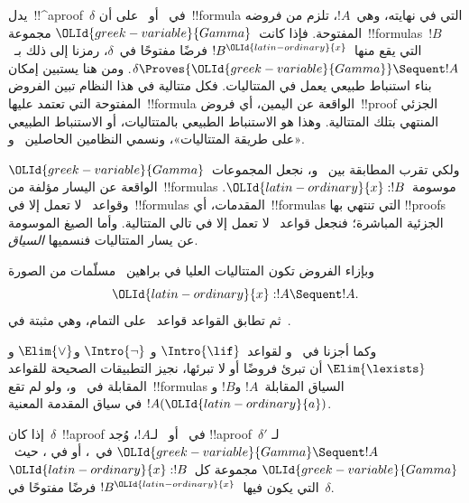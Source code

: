 \documentclass[../../../include/open-logic-section]{subfiles}
\begin{document}


يدل~!!^a{proof}~$\delta$ في~ أو~ على أن~!!{formula}
التي في نهايته، وهي~$!A$، تلزم من فروضه المفتوحة. فإذا كانت~${\OLId{greek-variable}{Gamma}}$
مجموعة~!!{formula}s~$!B$ التي يقع منها~$!B^{\OLId{latin-ordinary}{x}}$ فرضًا مفتوحًا في~$\delta$،
رمزنا إلى ذلك بـ~$\delta \Proves {\OLId{greek-variable}{Gamma}} \Sequent !A$. ومن هنا يستبين
إمكان بناء استنباط طبيعي يعمل في المتتاليات. فكل متتالية في هذا النظام
تبين الفروض المفتوحة التي تعتمد عليها~!!{formula} الواقعة عن اليمين،
أي فروض~!!{proof} الجزئي المنتهي بتلك المتتالية. وهذا هو الاستنباط
الطبيعي بالمتتاليات، أو الاستنباط الطبيعي «على طريقة المتتاليات»،
ونسمي النظامين الحاصلين~ و.

ولكي تقرب المطابقة بين~ و، نجعل المجموعات~${\OLId{greek-variable}{Gamma}}$
الواقعة عن اليسار مؤلفة من~!!{formula}s موسومة~${\OLId{latin-ordinary}{x}}:!B$. وقواعد~
لا تعمل إلا في~!!{formula}s المقدمات، أي~!!{formula}s التي تنتهي بها
!!{proof}s الجزئية المباشرة؛ فنجعل قواعد~ لا تعمل إلا في تالي
المتتالية. وأما الصيغ الموسومة عن يسار المتتاليات فنسميها
\emph{السياق}.

وبإزاء الفروض تكون المتتاليات العليا في براهين~ مسلّمات من الصورة
\[{\OLId{latin-ordinary}{x}}:!A \Sequent !A.\]
ثم تطابق القواعد قواعد~ على التمام، وهي مثبتة في~.



وكما أجزنا في~ و لقواعد~$\Intro{\lif}$ و
$\Intro{\lnot}$ و$\Elim{\lor}$ و$\Elim{\lexists}$ أن تبرئ فروضًا أو
لا تبرئها، نجيز التطبيقات الصحيحة للقواعد المقابلة في~
و، ولو لم تقع~!!{formula}s السياق المقابلة~$!A$ و$!B$
و$!A({\OLId{latin-ordinary}{a}})$ في سياق المقدمة المعنية.

\begin{prop}
إذا كان~$\delta$~!!a{proof} في~ أو~ لـ$!A$، وُجد
!!a{proof}~$\delta'$ لـ${\OLId{greek-variable}{Gamma}} \Sequent !A$ في~، أو في
، حيث~${\OLId{greek-variable}{Gamma}}$ مجموعة كل~${\OLId{latin-ordinary}{x}}:!B$ التي يكون فيها~$!B^{\OLId{latin-ordinary}{x}}$ فرضًا
مفتوحًا في~$\delta$.
\end{prop}
\end{document}
